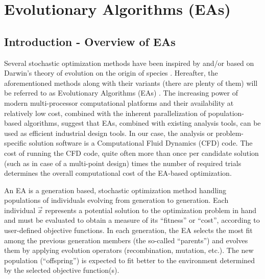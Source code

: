\chapter{Evolutionary Algorithms (EAs)} %


\ifpdf
    \graphicspath{{2/figures/PNG/}{2/figures/PDF/}{2/figures/}}
\else
    \graphicspath{{2/figures/EPS/}{2/figures/}}
\fi


\section{Introduction - Overview of EAs}
\label{EAintro}
Several stochastic optimization methods have been inspired by and/or based on Darwin's theory of evolution on the origin of species \cite{Darwin}. Hereafter, the aforementioned methods along with their variants (there are plenty of them) will be referred to as Evolutionary Algorithms (EAs) \cite{HowToSolveIt}. The increasing power of modern multi-processor computational platforms and their availability at relatively low cost, combined with the inherent parallelization of population-based algorithms, suggest that EAs, combined with existing analysis tools, can be used as efficient industrial design tools. In our case, the analysis or problem-specific solution software is a Computational Fluid Dynamics (CFD) code. The cost of running the CFD code, quite often more than once per candidate solution (such as in case of a multi-point design) times the number of required trials determines the overall computational cost of the EA-based optimization.      

An EA is a generation based, stochastic optimization method handling populations of individuals evolving from generation to generation. Each individual $\vec{x}$ represents a potential solution to the optimization problem in hand and must be evaluated to obtain a measure of its ``fitness'' or ``cost'', according to user-defined objective functions. In each generation, the EA selects the most fit among the previous generation members (the so-called ``parents'') and evolves them by applying evolution operators (recombination, mutation, etc.). The new population (``offspring'') is expected to fit better to the environment determined by the selected objective function(s).     

